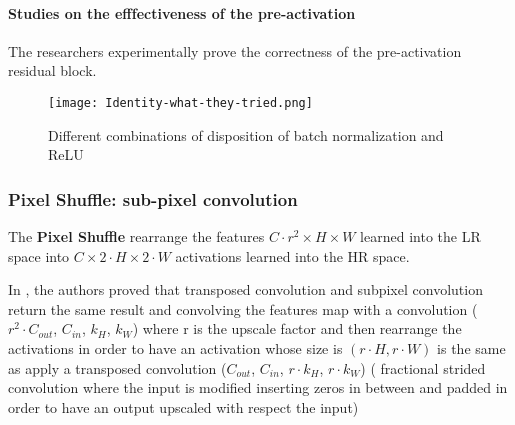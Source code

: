 \paragraph{Studies on the efffectiveness of the pre-activation}
The researchers experimentally prove the correctness of the pre-activation residual block.
\begin{figure}[H]
    \centering
    \texttt{[image: Identity-what-they-tried.png]}
    \caption{Different combinations of disposition of batch normalization and ReLU}
\end{figure}


\subsubsection{Pixel Shuffle: sub-pixel convolution}

The \textbf{Pixel Shuffle} rearrange the features $C \cdot r^2 \times H \times W$ learned into the LR space into $C \times 2 \cdot H \times 2 \cdot W$ activations learned into the HR space.

In \cite{eli5subpixelconvolution}, the authors proved that transposed convolution and subpixel convolution return the same result and convolving the features map with a convolution ($r^2 \cdot C_{out}$, $C_{in}$, $k_H$, $k_W$) where r is the upscale factor and then rearrange the activations in order to have an activation whose size is $(r \cdot H, r \cdot W)$ is the same as apply a transposed convolution ($C_{out}$, $C_{in}$, $r \cdot k_H$, $r \cdot k_W$)  ( fractional strided convolution where the input is modified inserting zeros in between and padded in order to have an output upscaled with respect the input) 
